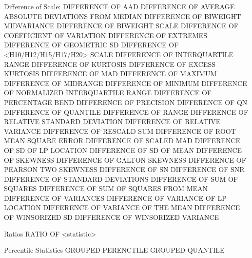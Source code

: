 Difference of Scale:
   DIFFERENCE OF AAD
   DIFFERENCE OF AVERAGE ABSOLUTE DEVIATIONS FROM MEDIAN
   DIFFERENCE OF BIWEIGHT MIDVARIANCE
   DIFFERENCE OF BIWEIGHT SCALE
   DIFFERENCE OF COEFFICIENT OF VARIATION
   DIFFERENCE OF EXTREMES
   DIFFERENCE OF GEOMETRIC SD
   DIFFERENCE OF <H10/H12/H15/H17/H20> SCALE
   DIFFERENCE OF INTERQUARTILE RANGE
   DIFFERENCE OF KURTOSIS
   DIFFERENCE OF EXCESS KURTOSIS
   DIFFERENCE OF MAD
   DIFFERENCE OF MAXIMUM
   DIFFERENCE OF MIDRANGE
   DIFFERENCE OF MINIMUM
   DIFFERENCE OF NORMALIZED INTERQUARTILE RANGE
   DIFFERENCE OF PERCENTAGE BEND
   DIFFERENCE OF PRECISION
   DIFFERENCE OF QN
   DIFFERENCE OF QUANTILE
   DIFFERENCE OF RANGE
   DIFFERENCE OF RELATIVE STANDARD DEVIATION
   DIFFERENCE OF RELATIVE VARIANCE
   DIFFERENCE OF RESCALD SUM
   DIFFERENCE OF ROOT MEAN SQUARE ERROR
   DIFFERENCE OF SCALED MAD
   DIFFERENCE OF SD OF LP LOCATION
   DIFFERENCE OF SD OF MEAN
   DIFFERENCE OF SKEWNESS
   DIFFERENCE OF GALTON SKEWNESS
   DIFFERENCE OF PEARSON TWO SKEWNESS
   DIFFERENCE OF SN
   DIFFERENCE OF SNR
   DIFFERENCE OF STANDARD DEVIATIONS
   DIFFERENCE OF SUM OF SQUARES
   DIFFERENCE OF SUM OF SQUARES FROM MEAN
   DIFFERENCE OF VARIANCES
   DIFFERENCE OF VARIANCE OF LP LOCATION
   DIFFERENCE OF VARIANCE OF THE MEAN
   DIFFERENCE OF WINSORIZED SD
   DIFFERENCE OF WINSORIZED VARIANCE

Ratios
   RATIO OF <statistic>

Percentile Statistics
   GROUPED PERENCTILE
   GROUPED QUANTILE

